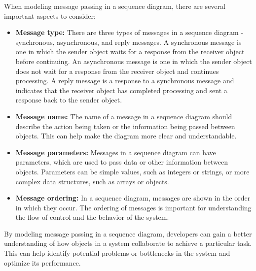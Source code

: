 \documentclass{article}
\begin{document}
When modeling message passing in a sequence diagram, there are several important aspects to consider:
\begin{itemize}
	\item \textbf{Message type:} There are three types of messages in a sequence diagram - synchronous, asynchronous, and reply messages. A synchronous message is one in which the sender object waits for a response from the receiver object before continuing. An asynchronous message is one in which the sender object does not wait for a response from the receiver object and continues processing. A reply message is a response to a synchronous message and indicates that the receiver object has completed processing and sent a response back to the sender object.
	\item \textbf{Message name:} The name of a message in a sequence diagram should describe the action being taken or the information being passed between objects. This can help make the diagram more clear and understandable.
	\item \textbf{Message parameters:} Messages in a sequence diagram can have parameters, which are used to pass data or other information between objects. Parameters can be simple values, such as integers or strings, or more complex data structures, such as arrays or objects.
	\item \textbf{Message ordering:} In a sequence diagram, messages are shown in the order in which they occur. The ordering of messages is important for understanding the flow of control and the behavior of the system.

\end{itemize}
By modeling message passing in a sequence diagram, developers can gain a better understanding of how objects in a system collaborate to achieve a particular task. This can help identify potential problems or bottlenecks in the system and optimize its performance.
\end{document}

